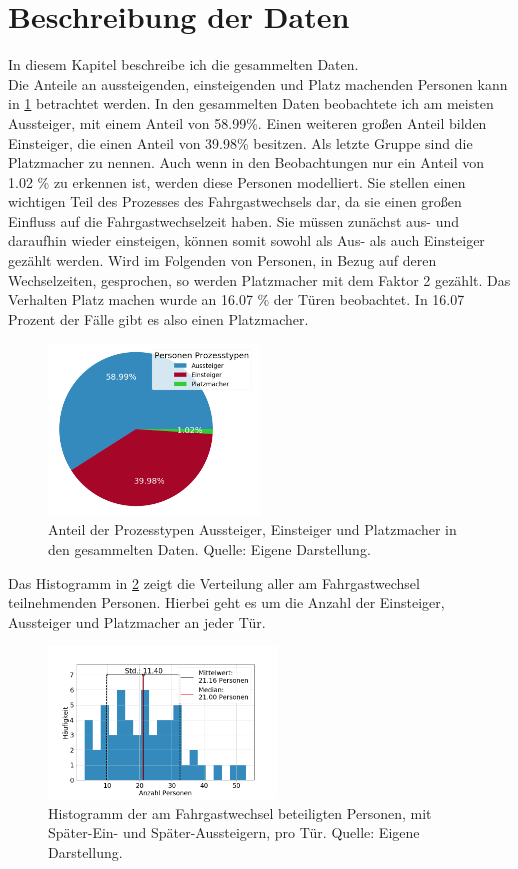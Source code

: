 \section{Beschreibung der Daten} \label{Beschreibung der Daten}
In diesem Kapitel beschreibe ich die gesammelten Daten.\\
Die Anteile an aussteigenden, einsteigenden und Platz machenden Personen kann in \figurename \ref{fig:AnteileProzesstypen} betrachtet werden. In den gesammelten Daten beobachtete ich am meisten Aussteiger, mit einem Anteil von 58.99\%. Einen weiteren großen Anteil bilden Einsteiger, die einen Anteil von 39.98\% besitzen. Als letzte Gruppe sind die Platzmacher zu nennen. Auch wenn in den Beobachtungen nur ein Anteil von 1.02 \% zu erkennen ist, werden diese Personen modelliert. Sie stellen einen wichtigen Teil des Prozesses des Fahrgastwechsels dar, da sie einen großen Einfluss auf die Fahrgastwechselzeit haben. Sie müssen zunächst aus- und daraufhin wieder einsteigen, können somit sowohl als Aus- als auch Einsteiger gezählt werden. Wird im Folgenden von Personen, in Bezug auf deren Wechselzeiten, gesprochen, so werden Platzmacher mit dem Faktor 2 gezählt. Das Verhalten Platz machen wurde an 16.07 \% der Türen beobachtet. In 16.07 Prozent der Fälle gibt es also einen Platzmacher.
\begin{figure}[H]
	\centering
		\includegraphics[width=0.5\textwidth]{pictures/data_evaluation/data_description/process_types.png}
	\caption{Anteil der Prozesstypen Aussteiger, Einsteiger und Platzmacher in den gesammelten Daten.  Quelle: Eigene Darstellung.}
	\label{fig:AnteileProzesstypen}
\end{figure}
Das Histogramm in \figurename\ref{fig:histAllePersonen} zeigt die Verteilung aller am Fahrgastwechsel teilnehmenden Personen. Hierbei geht es um die Anzahl der Einsteiger, Aussteiger und Platzmacher an jeder Tür.
\begin{figure}[H]
	\centering
		\includegraphics[width=0.54\textwidth]{pictures/data_evaluation/data_description/hist_persons.png}
	\caption{Histogramm der am Fahrgastwechsel beteiligten Personen, mit Später-Ein- und Später-Aussteigern, pro Tür. Quelle: Eigene Darstellung.}
	\label{fig:histAllePersonen}
\end{figure}
